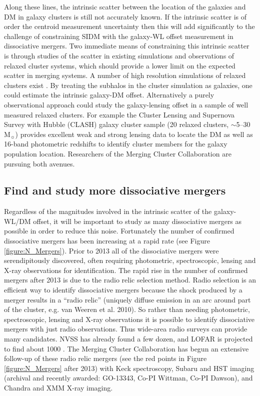 Along these lines, the intrinsic scatter between the location of the galaxies and DM in galaxy clusters is still not accurately known.
If the intrinsic scatter is of order the centroid measurement uncertainty then this will add significantly to the challenge of constraining SIDM with the galaxy-WL offset measurement in dissociative mergers.
Two immediate means of constraining this intrinsic scatter is through studies of the scatter in existing simulations and observations of relaxed cluster systems, which should provide a lower limit on the expected scatter in merging systems.
A number of high resolution simulations of relaxed clusters exist \citep[e.g.][which include both CDM and SIDM simulations]{Peter:2012vi, Rocha:2012tr}.
By treating the subhalos in the cluster simulation as galaxies, one could estimate the intrinsic galaxy-DM offset.
Alternatively a purely observational approach could study the galaxy-lensing offset in a sample of well measured relaxed clusters.
For example the Cluster Lensing and Supernova Survey with Hubble (CLASH) galaxy cluster sample (20 relaxed clusters, $\sim$5--30\,M$_\sun$) provides excellent weak and strong lensing data to locate the DM as well as 16-band photometric redshifts to identify cluster members for the galaxy population location.
Researchers of the Merging Cluster Collaboration are pursuing both avenues.

\subsection{Find and study more dissociative mergers}

Regardless of the magnitudes involved in the intrinsic scatter of the galaxy-WL/DM offset, it will be important to study as many dissociative mergers as possible in order to reduce this noise.
Fortunately the number of confirmed dissociative mergers has been increasing at a rapid rate (see Figure \ref{figure:N_Mergers}).
Prior to 2013 all of the dissociative mergers were serendipitously discovered, often requiring photometric, spectroscopic, lensing and X-ray observations for identification.
The rapid rise in the number of confirmed mergers after 2013 is due to the radio relic selection method.
Radio selection is an efficient way to identify dissociative mergers because the shock produced by a merger results in a ``radio relic'' (uniquely diffuse emission in an arc around part of the cluster, e.g. van Weeren et al. 2010).
So rather than needing photometric, spectroscopic, lensing and X-ray observations it is possible to identify dissociative mergers with just radio observations.
Thus wide-area radio surveys can provide many candidates. 
NVSS has already found a few dozen, and LOFAR is projected to find about 1000 \citep{Nuza:2012fu}.
The Merging Cluster Collaboration has begun an extensive follow-up of these radio relic mergers (see the red points in Figure \ref{figure:N_Mergers} after 2013) with Keck spectroscopy, Subaru and HST imaging (archival and recently awarded: GO-13343, Co-PI Wittman, Co-PI Dawson), and Chandra and XMM X-ray imaging.

